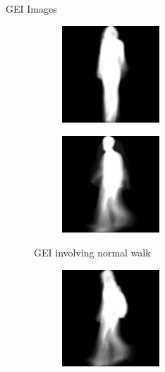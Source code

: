 \documentclass[xcolor=dvipsnames]{beamer}
\begin{document}
\begin{frame}{GEI Images}

\begin{figure}[!h]
    \centering
    \begin{subfigure}{0.3\textwidth}
        \centering
        \includegraphics[width=0.4\textwidth]{walk-nm1.jpg}
        
        \label{fig:img1}
    \end{subfigure}
    \begin{subfigure}{0.3\textwidth}
        \centering
        \includegraphics[width=0.4\textwidth]{walk-nm2.jpg}
        
        \label{fig:img2}
    \end{subfigure}
    \caption{GEI involving normal walk}
    
\end{figure}

\begin{figure}[!h]
    \centering
    \begin{subfigure}{0.3\textwidth}
        \centering
        \includegraphics[width=0.4\textwidth]{walk-bg1.jpg}
        

\end{subfigure}
\end{figure}
\end{frame}
\end{document}

